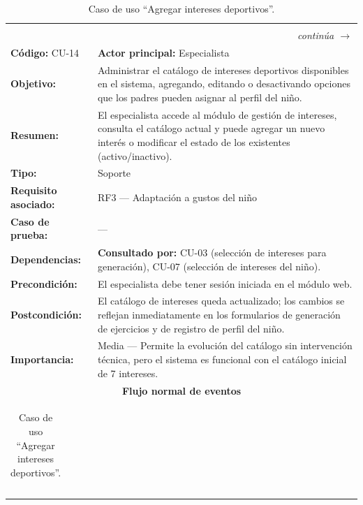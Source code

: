 					\begin{longtable}{p{4cm}p{10.4cm}}
						\caption{Caso de uso ``Agregar intereses deportivos''.}\label{tab:cu14}\\
						\hline
						\rowcolor{headblue}\multicolumn{2}{c}{\textbf{\color{white}Caso de uso ``Agregar intereses deportivos''}}\\\hline
						\endfirsthead
						\hline\rowcolor{headblue}\multicolumn{2}{c}{\textbf{\color{white}Caso de uso ``Agregar intereses deportivos'' (continuación)}}\\\hline
						\endhead
						\hline\multicolumn{2}{r}{\footnotesize\itshape continúa $\rightarrow$}\\\endfoot
						\hline\endlastfoot
						\textbf{Código:} CU-14 & \textbf{Actor principal:} Especialista\\\hline
						\textbf{Objetivo:} & Administrar el catálogo de intereses deportivos disponibles en el sistema, agregando, editando o desactivando opciones que los padres pueden asignar al perfil del niño.\\
						\textbf{Resumen:} & El especialista accede al módulo de gestión de intereses, consulta el catálogo actual y puede agregar un nuevo interés o modificar el estado de los existentes (activo/inactivo).\\
						\textbf{Tipo:} & Soporte\\
						\textbf{Requisito asociado:} & RF3 --- Adaptación a gustos del niño\\
						\textbf{Caso de prueba:} & ---\\
						\textbf{Dependencias:} & \textbf{Consultado por:} CU-03 (selección de intereses para generación), CU-07 (selección de intereses del niño).\\
						\textbf{Precondición:} & El especialista debe tener sesión iniciada en el módulo web.\\
						\textbf{Postcondición:} & El catálogo de intereses queda actualizado; los cambios se reflejan inmediatamente en los formularios de generación de ejercicios y de registro de perfil del niño.\\
						\textbf{Importancia:} & Media --- Permite la evolución del catálogo sin intervención técnica, pero el sistema es funcional con el catálogo inicial de 7 intereses.\\\hline
						\multicolumn{2}{c}{\cellcolor{grpgray}\textbf{Flujo normal de eventos}}\\\hline
						\multicolumn{2}{p{14.4cm}}{%
							\begin{tabular}{p{7.0cm}p{7.0cm}}

\end{tabular}}
\end{longtable}
